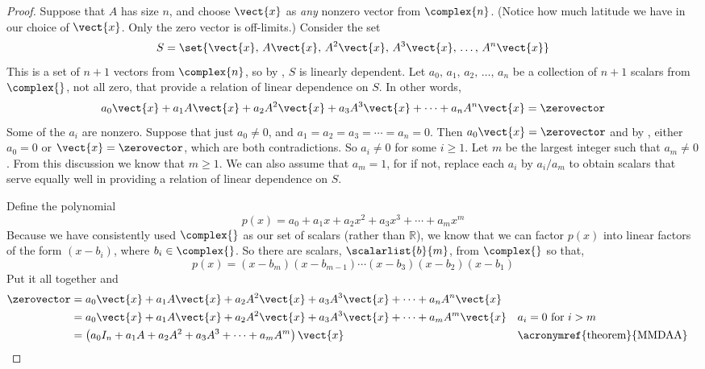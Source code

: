 \begin{proof}
Suppose that $A$ has size $n$, and choose $\vect{x}$ as {\em any} nonzero vector from $\complex{n}$.  (Notice how much latitude we have in our choice of $\vect{x}$.  Only the zero vector is off-limits.)  Consider the set
%
\begin{equation*}
S=\set{\vect{x},\,A\vect{x},\,A^2\vect{x},\,A^3\vect{x},\,\ldots,\,A^n\vect{x}}
\end{equation*}
%
This is a set of $n+1$ vectors from $\complex{n}$, so by , $S$ is linearly dependent.  Let $a_0,\,a_1,\,a_2,\,\ldots,\,a_n$ be a collection of $n+1$ scalars from $\complex{\null}$, not all zero, that provide a relation of linear dependence on $S$.  In other words,
%
\begin{equation*}
a_0\vect{x}+a_1A\vect{x}+a_2A^2\vect{x}+a_3A^3\vect{x}+\cdots+a_nA^n\vect{x}=\zerovector
\end{equation*}
%
Some of the $a_i$ are nonzero.  Suppose that just $a_0\neq 0$, and $a_1=a_2=a_3=\cdots=a_n=0$.  Then $a_0\vect{x}=\zerovector$ and by , either $a_0=0$ or $\vect{x}=\zerovector$, which are both contradictions.  So $a_i\neq 0$ for some $i\geq 1$.  Let $m$ be the largest integer such that $a_m\neq 0$.  From this discussion we know that $m\geq 1$.  We can also assume that $a_m=1$, for if not, replace each $a_i$ by $a_i/a_m$ to obtain scalars that serve equally well in providing a relation of linear dependence on $S$.\par
%
Define the polynomial
%
\begin{equation*}
p(x)=a_0+a_1x+a_2x^2+a_3x^3+\cdots+a_mx^m
\end{equation*}
%
Because we have consistently used $\complex{\null}$ as our set of scalars (rather than ${\mathbb R}$), we know that we can factor $p(x)$ into linear factors of the form $(x-b_i)$, where $b_i\in\complex{\null}$.  So there are scalars, $\scalarlist{b}{m}$, from $\complex{\null}$ so that,
%
\begin{equation*}
p(x)=(x-b_m)(x-b_{m-1})\cdots(x-b_3)(x-b_2)(x-b_1)
\end{equation*}
%
Put it all together and
%
\begin{align*}
\zerovector&=a_0\vect{x}+a_1A\vect{x}+a_2A^2\vect{x}+a_3A^3\vect{x}+\cdots+a_nA^n\vect{x}\\
&=a_0\vect{x}+a_1A\vect{x}+a_2A^2\vect{x}+a_3A^3\vect{x}+\cdots+a_mA^m\vect{x}&&\text{$a_i=0$ for $i>m$}\\
&=\left(a_0I_n+a_1A+a_2A^2+a_3A^3+\cdots+a_mA^m\right)\vect{x}&&\text{\acronymref{theorem}{MMDAA}}\\

\end{align*}
\end{proof}
